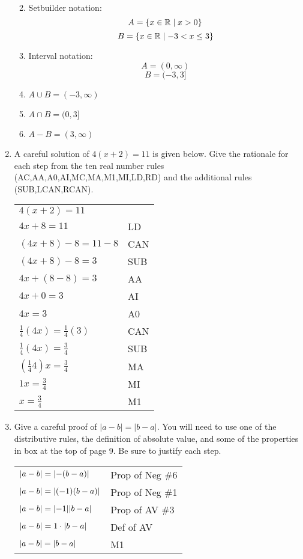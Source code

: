 \documentclass[letterpaper,12pt,fleqn]{article}
\begin{document}
\begin{enumerate}
\begin{enumerate}

\item Setbuilder notation:
\[A=\{x\in\mathbb{R}\mid x>0\}\]
\[B=\{x\in\mathbb{R}\mid -3<x\le3\}\]

\item Interval notation:
\[A=(0,\infty)\]
\[B=(-3,3]\]

\item $A\cup B=(-3,\infty)$

\item $A\cap B=(0,3]$

\item $A-B=(3,\infty)$

\end{enumerate}

\bigskip

\item A careful solution of $4(x+2)=11$ is given below. Give the rationale for
each step from the ten real number rules (AC,AA,A0,AI,MC,MA,M1,MI,LD,RD) and
the additional rules (SUB,LCAN,RCAN).

\begin{tabular}{ll}
$4(x+2)=11$ & \\
$4x+8=11$ & LD \\
$(4x+8)-8=11-8$ & CAN \\
$(4x+8)-8=3$ & SUB \\
$4x+(8-8)=3$ & AA \\
$4x+0=3$ & AI \\
$4x=3$ & A0 \\
$\frac{1}{4}(4x)=\frac{1}{4}(3)$ & CAN \\
$\frac{1}{4}(4x)=\frac{3}{4}$ & SUB \\
$(\frac{1}{4}4)x=\frac{3}{4}$ & MA \\
$1x=\frac{3}{4}$ & MI \\
$x=\frac{3}{4}$ & M1 \\
\end{tabular}

\item Give a careful proof of $|a-b|=|b-a|$. You will need to use one of the
distributive rules, the definition of absolute value, and some of the
properties in box at the top of page 9. Be sure to justify each step.

\bigskip

\begin{tabular}{ll}
$\lvert a-b\rvert=\lvert-(b-a)\rvert$ & Prop of Neg \#6 \\
$\lvert a-b\rvert=\lvert(-1)(b-a)\rvert$ & Prop of Neg \#1 \\
$\lvert a-b\rvert=\lvert-1\rvert\lvert b-a\rvert$ & Prop of AV \#3 \\
$\lvert a-b\rvert=1\cdot\lvert b-a\rvert$ & Def of AV \\
$\lvert a-b\rvert=\lvert b-a\rvert$ & M1 \\
\end{tabular}
\end{enumerate}
\end{document}

